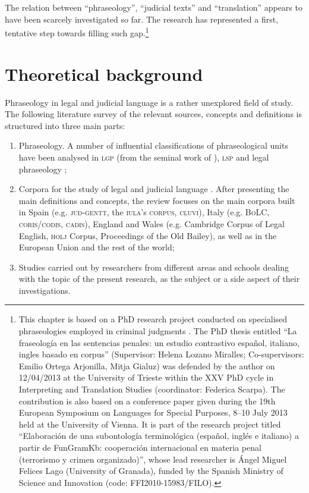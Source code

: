 \documentclass[output=paper]{LSP/langsci}
\begin{document}
The relation between “phraseology”, “judicial texts” and “translation” appears to have been scarcely investigated so far. The research has represented a first, tentative step towards filling such gap.\footnote{This chapter is based on a PhD research project conducted on specialised phraseologies employed in criminal judgments \citep{Pontrandolfo2013a}. The PhD thesis entitled “La fraseología en las sentencias penales: un estudio contrastivo español, italiano, ingles basado en corpus” (Supervisor: Helena Lozano Miralles; Co-supervisors: Emilio Ortega Arjonilla, Mitja Gialuz) was defended by the author on 12/04/2013 at the University of Trieste within the XXV PhD cycle in Interpreting and Translation Studies (coordinator: Federica Scarpa). The contribution is also based on a conference paper given during the 19th European Symposium on Languages for Special Purposes, 8--10 July 2013 held at the University of Vienna. It is part of the research project titled “Elaboración de una subontología terminológica (español, inglés e italiano) a partir de FunGramKb: cooperación internacional en materia penal (terrorismo y crimen organizado)”, whose lead researcher is Ángel Miguel Felices Lago (University of Granada), funded by the Spanish Ministry of Science and Innovation (code: FFI2010-15983/FILO).}

\section{Theoretical background}
Phraseology in legal and judicial language is a rather unexplored field of study. The following literature survey of the relevant sources, concepts and definitions is structured into three main parts:

\begin{enumerate}
\item Phraseology. A number of influential classifications of phraseological units have been analysed in \textsc{lgp} (from the seminal work of \citealt{Benson1986,Corpas1996,Gläser1994/1995,Glaeser1998,Ruiz1997,Cowie1988,Cowie2001,Melchuk1998, Moon1998,Burger1998,Granger2008}), \textsc{lsp}  \citep{Homme2000,Lorente2001,Tercedor1999,Montero2002,Bevilacqua2004,Aguado2007} and legal phraseology \citep {Kjær1990,Kjaer1990b};
\item Corpora for the study of legal and judicial language \citep[see][]{Pontrandolfo2012}. After presenting the main definitions and concepts, the review focuses on the main corpora built in Spain (e.g. \textsc{jud}-\textsc{gentt}, the \textsc{iula}’s \textsc{corpus}, \textsc{cluvi}), Italy (e.g. \textsc{BoLC}, \textsc{coris}/\textsc{codis}, \textsc{cadis}), England and Wales (e.g. Cambridge Corpus of Legal English, \textsc{holj} Corpus, Proceedings of the Old Bailey), as well as in the European Union and the rest of the world;
\item Studies carried out by researchers from different areas and schools dealing with the topic of the present research, as the subject or a side aspect of their investigations.
\end{enumerate}
\end{document}
